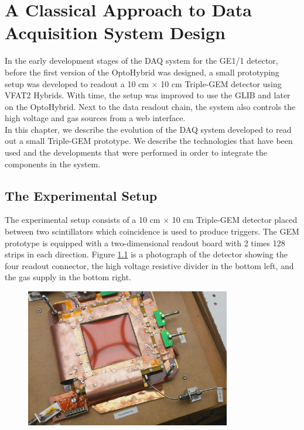 \chapter{A Classical Approach to Data Acquisition System Design}
\label{chap:III-1-arch}

  In the early development stages of the DAQ system for the GE1/1 detector, before the first version of the OptoHybrid was designed, a small prototyping setup was developed to readout a 10 cm $ \times $ 10 cm Triple-GEM detector using VFAT2 Hybrids. With time, the setup was improved to use the GLIB and later on the OptoHybrid. Next to the data readout chain, the system also controls the high voltage and gas sources from a web interface. \\

  In this chapter, we describe the evolution of the DAQ system developed to read out a small Triple-GEM prototype. We describe the technologies that have been used and the developments that were performed in order to integrate the components in the system.

  \section{The Experimental Setup}

    The experimental setup consists of a 10 cm $ \times $ 10 cm Triple-GEM detector placed between two scintillators which coincidence is used to produce triggers. The GEM prototype is equipped with a two-dimensional readout board with 2 times 128 strips in each direction. Figure \ref{fig:III-1-gem} is a photograph of the detector showing the four readout connector, the high voltage resistive divider in the bottom left, and the gas supply in the bottom right. \\

      \begin{figure}[h!]
        \centering
        \includegraphics[width=0.8\textwidth]{img/III-1-arch/gem.png}
        \caption{}
        \label{fig:III-1-gem}
      \end{figure}

